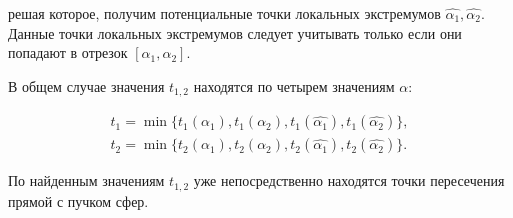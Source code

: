 \documentclass[a4paper,10pt]{extarticle}                     %
\numberwithin{equation}{section}                             %
\numberwithin{figure}{section}                               %
\theoremstyle{plain}                                         %
\begin{document}
решая которое, получим потенциальные точки локальных экстремумов $\hat{\alpha_1}, \hat{\alpha_2}$.
Данные точки локальных экстремумов следует учитывать только если они попадают в отрезок $[\alpha_1, \alpha_2]$.

В общем случае значения $t_{1,2}$ находятся по четырем значениям $\alpha$:

\begin{align}
    t_1 = \min\{t_1(\alpha_1), t_1(\alpha_2), t_1(\hat{\alpha_1}), t_1(\hat{\alpha_2})\}, \\
    t_2 = \min\{t_2(\alpha_1), t_2(\alpha_2), t_2(\hat{\alpha_1}), t_2(\hat{\alpha_2})\}.
\end{align}

По найденным значениям $t_{1, 2}$ уже непосредственно находятся точки пересечения прямой с пучком сфер.
\end{document}
